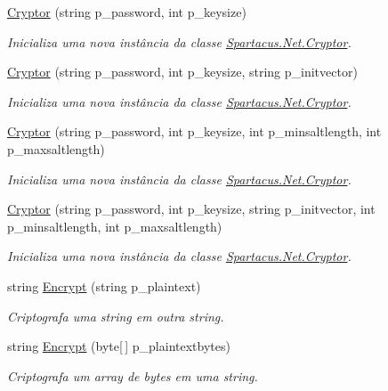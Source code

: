 \begin{DoxyCompactItemize}
\hyperlink{classSpartacus_1_1Net_1_1Cryptor_a7b6ba3b157d68fc1cba8e54473ee31d2}{Cryptor} (string p\+\_\+password, int p\+\_\+keysize)
\begin{DoxyCompactList}\small\item\em Inicializa uma nova instância da classe \hyperlink{classSpartacus_1_1Net_1_1Cryptor}{Spartacus.\+Net.\+Cryptor}. \end{DoxyCompactList}\item 
\hyperlink{classSpartacus_1_1Net_1_1Cryptor_a950f5a483790a9157aa41931563e84af}{Cryptor} (string p\+\_\+password, int p\+\_\+keysize, string p\+\_\+initvector)
\begin{DoxyCompactList}\small\item\em Inicializa uma nova instância da classe \hyperlink{classSpartacus_1_1Net_1_1Cryptor}{Spartacus.\+Net.\+Cryptor}. \end{DoxyCompactList}\item 
\hyperlink{classSpartacus_1_1Net_1_1Cryptor_a268451d8e02dcfc497dfbad8f9bc5991}{Cryptor} (string p\+\_\+password, int p\+\_\+keysize, int p\+\_\+minsaltlength, int p\+\_\+maxsaltlength)
\begin{DoxyCompactList}\small\item\em Inicializa uma nova instância da classe \hyperlink{classSpartacus_1_1Net_1_1Cryptor}{Spartacus.\+Net.\+Cryptor}. \end{DoxyCompactList}\item 
\hyperlink{classSpartacus_1_1Net_1_1Cryptor_a769e71a85f005fd001df0823ef4bb783}{Cryptor} (string p\+\_\+password, int p\+\_\+keysize, string p\+\_\+initvector, int p\+\_\+minsaltlength, int p\+\_\+maxsaltlength)
\begin{DoxyCompactList}\small\item\em Inicializa uma nova instância da classe \hyperlink{classSpartacus_1_1Net_1_1Cryptor}{Spartacus.\+Net.\+Cryptor}. \end{DoxyCompactList}\item 
string \hyperlink{classSpartacus_1_1Net_1_1Cryptor_a21fe44b9046d49fa0efc47b544f1c571}{Encrypt} (string p\+\_\+plaintext)
\begin{DoxyCompactList}\small\item\em Criptografa uma string em outra string. \end{DoxyCompactList}\item 
string \hyperlink{classSpartacus_1_1Net_1_1Cryptor_a6f1c6d8afb1c54433b25c61b9191369b}{Encrypt} (byte\mbox{[}$\,$\mbox{]} p\+\_\+plaintextbytes)
\begin{DoxyCompactList}\small\item\em Criptografa um array de bytes em uma string. \end{DoxyCompactList}\item 

\end{DoxyCompactItemize}
